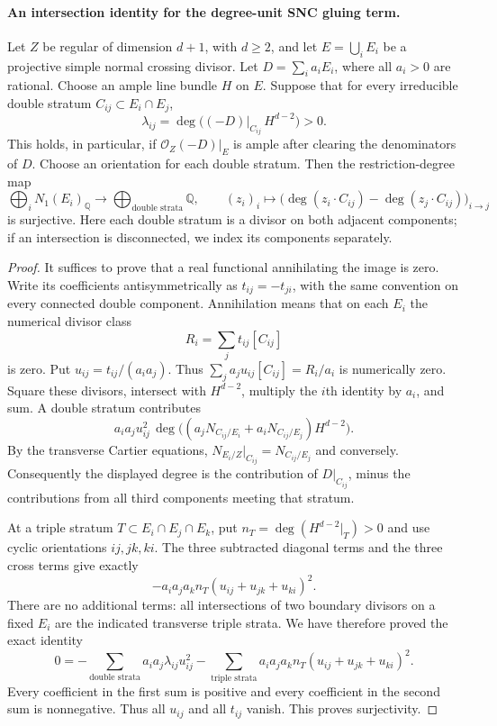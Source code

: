 \paragraph{An intersection identity for the degree-unit SNC gluing term.}
Let $Z$ be regular of dimension $d+1$, with $d\ge2$, and let
$E=\bigcup_iE_i$ be a projective simple normal crossing divisor.
Let $D=\sum_i a_iE_i$, where all $a_i>0$ are rational.
Choose an ample line bundle $H$ on $E$. Suppose that for every
irreducible double stratum $C_{ij}\subset E_i\cap E_j$,
\[
                  \lambda_{ij}
             =\deg\bigl((-D)|_{C_{ij}}\,H^{d-2}\bigr)>0.
\]
This holds, in particular, if $\mathcal O_Z(-D)|_E$ is ample after
clearing the denominators of $D$.
Choose an orientation for each double stratum. Then the restriction-degree
map
\[
 \bigoplus_i N_1(E_i)_{\mathbb Q}
       \longrightarrow\bigoplus_{\text{double strata}}\mathbb Q,
 \qquad (z_i)_i\longmapsto
       \bigl(\deg(z_i\cdot C_{ij})-
                         \deg(z_j\cdot C_{ij})\bigr)_{i\to j}
\]
is surjective. Here each double stratum is a divisor on both adjacent
components; if an intersection is disconnected, we index its components
separately.

\begin{proof}
It suffices to prove that a real functional annihilating the image is
zero. Write its coefficients antisymmetrically as $t_{ij}=-t_{ji}$,
with the same convention on every connected double component.
Annihilation means that on each $E_i$ the numerical divisor class
\[
                         R_i=\sum_jt_{ij}[C_{ij}]
\]
is zero. Put $u_{ij}=t_{ij}/(a_i a_j)$. Thus
$\sum_ja_ju_{ij}[C_{ij}]=R_i/a_i$ is numerically zero.
Square these divisors, intersect with $H^{d-2}$, multiply the $i$th
identity by $a_i$, and sum. A double stratum contributes
\[
 a_i a_j u_{ij}^2\,
 \deg\bigl((a_jN_{C_{ij}/E_i}
                    +a_iN_{C_{ij}/E_j})H^{d-2}\bigr).
\]
By the transverse Cartier equations,
$N_{E_i/Z}|_{C_{ij}}=N_{C_{ij}/E_j}$ and conversely.
Consequently the displayed degree is the contribution of $D|_{C_{ij}}$,
minus the contributions from all third components meeting that stratum.

At a triple stratum $T\subset E_i\cap E_j\cap E_k$, put
$n_T=\deg(H^{d-2}|_T)>0$ and use cyclic orientations $ij,jk,ki$.
The three subtracted diagonal terms and the three cross terms give
exactly
\[
             -a_i a_j a_k n_T
                       (u_{ij}+u_{jk}+u_{ki})^2.
\]
There are no additional terms: all intersections of two boundary
divisors on a fixed $E_i$ are the indicated transverse triple strata.
We have therefore proved the exact identity
\begin{equation*}
 0=-\sum_{\text{double strata}}a_i a_j\lambda_{ij}u_{ij}^2
   -\sum_{\text{triple strata}}a_i a_j a_k n_T
                          (u_{ij}+u_{jk}+u_{ki})^2.
\end{equation*}
Every coefficient in the first sum is positive and every coefficient
in the second sum is nonnegative. Thus all $u_{ij}$ and all $t_{ij}$
vanish. This proves surjectivity.
\end{proof}

